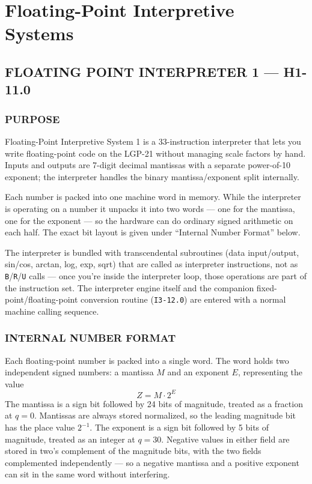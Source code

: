 \section{Floating-Point Interpretive Systems}
\label{sec:floating_point_interpreters}

\subsection*{FLOATING POINT INTERPRETER 1 --- H1-11.0}
\label{H1-11.0}
\label{subsec:floating_point_1}

\subsubsection*{PURPOSE}
Floating-Point Interpretive System 1 is a 33-instruction interpreter that lets you write floating-point code on the LGP-21 without managing scale factors by hand. Inputs and outputs are 7-digit decimal mantissas with a separate power-of-10 exponent; the interpreter handles the binary mantissa/exponent split internally.

Each number is packed into one machine word in memory. While the interpreter is operating on a number it unpacks it into two words --- one for the mantissa, one for the exponent --- so the hardware can do ordinary signed arithmetic on each half. The exact bit layout is given under ``Internal Number Format'' below.

The interpreter is bundled with transcendental subroutines (data input/output, sin/cos, arctan, log, exp, sqrt) that are called as interpreter instructions, not as \texttt{B}/\texttt{R}/\texttt{U} calls --- once you're inside the interpreter loop, those operations are part of the instruction set. The interpreter engine itself and the companion fixed-point/floating-point conversion routine (\texttt{I3-12.0}) are entered with a normal machine calling sequence.

\subsubsection*{INTERNAL NUMBER FORMAT}
Each floating-point number is packed into a single word. The word holds two independent signed numbers: a mantissa $M$ and an exponent $E$, representing the value
\[ Z = M \cdot 2^E \]
The mantissa is a sign bit followed by 24 bits of magnitude, treated as a fraction at $q=0$. Mantissas are always stored normalized, so the leading magnitude bit has the place value $2^{-1}$. The exponent is a sign bit followed by 5 bits of magnitude, treated as an integer at $q=30$. Negative values in either field are stored in two's complement of the magnitude bits, with the two fields complemented independently --- so a negative mantissa and a positive exponent can sit in the same word without interfering.

